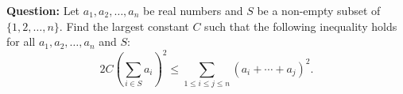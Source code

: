 \begin{examplebox}
\textbf{Question:} Let $a_1, a_2, \ldots, a_n$ be real numbers and $S$ be a non-empty subset of $\{1,2, \ldots, n\}$. Find the largest constant $C$ such that the following inequality holds for all $a_1, a_2, \ldots, a_n$ and $S$:
$$
2C \left(\sum_{i \in S} a_i\right)^2 \leq \sum_{1 \leq i \leq j \leq n}\left(a_i+\cdots+a_j\right)^2.
$$
\end{examplebox}
